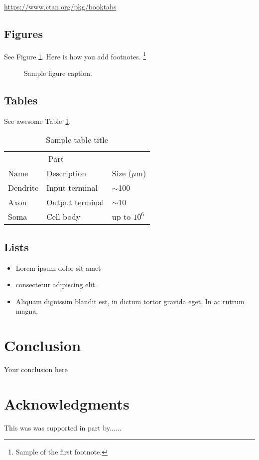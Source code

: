 \documentclass{article}
\begin{document}
\begin{center}
  \url{https://www.ctan.org/pkg/booktabs}
\end{center}


\subsection{Figures}
\lipsum[10] 
See Figure \ref{fig:fig1}. Here is how you add footnotes. \footnote{Sample of the first footnote.}
\lipsum[11] 

\begin{figure}
  \centering
  \fbox{\rule[-.5cm]{4cm}{4cm} \rule[-.5cm]{4cm}{0cm}}
  \caption{Sample figure caption.}
  \label{fig:fig1}
\end{figure}

\subsection{Tables}
\lipsum[12]
See awesome Table~\ref{tab:table}.

\begin{table}
 \caption{Sample table title}
  \centering
  \begin{tabular}{lll}
    \toprule
    \multicolumn{2}{c}{Part}                   \\
    \cmidrule(r){1-2}
    Name     & Description     & Size ($\mu$m) \\
    \midrule
    Dendrite & Input terminal  & $\sim$100     \\
    Axon     & Output terminal & $\sim$10      \\
    Soma     & Cell body       & up to $10^6$  \\
    \bottomrule
  \end{tabular}
  \label{tab:table}
\end{table}

\subsection{Lists}
\begin{itemize}
\item Lorem ipsum dolor sit amet
\item consectetur adipiscing elit. 
\item Aliquam dignissim blandit est, in dictum tortor gravida eget. In ac rutrum magna.
\end{itemize}


\section{Conclusion}
Your conclusion here

\section*{Acknowledgments}
This was was supported in part by......

  
  
\end{document}
